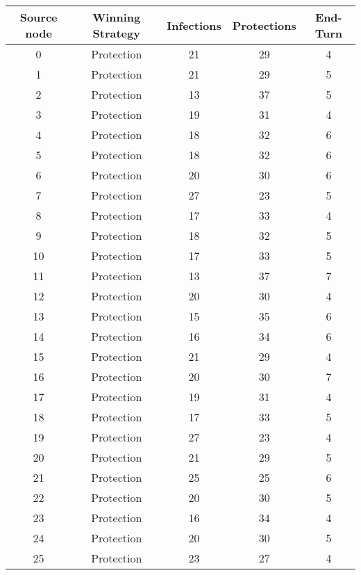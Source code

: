 \documentclass[results.tex]{subfiles}
\begin{document}
\begin{center}
  \begin{tabular}{| c || c | c | c | c |}
    \hline
    {\bfseries Source node} & {\bfseries Winning Strategy} & {\bfseries Infections} & {\bfseries Protections} & {\bfseries End-Turn} \\  %
    \hline\hline
    0 & Protection & 21 & 29 & 4 \\ 
    \hline
    1 & Protection & 21 & 29 & 5 \\ 
    \hline
    2 & Protection & 13 & 37 & 5 \\ 
    \hline
    3 & Protection & 19 & 31 & 4 \\ 
    \hline
    4 & Protection & 18 & 32 & 6 \\ 
    \hline
    5 & Protection & 18 & 32 & 6 \\ 
    \hline
    6 & Protection & 20 & 30 & 6 \\ 
    \hline
    7 & Protection & 27 & 23 & 5 \\ 
    \hline
    8 & Protection & 17 & 33 & 4 \\ 
    \hline
    9 & Protection & 18 & 32 & 5 \\ 
    \hline
    10 & Protection & 17 & 33 & 5 \\ 
    \hline
    11 & Protection & 13 & 37 & 7 \\ 
    \hline
    12 & Protection & 20 & 30 & 4 \\ 
    \hline
    13 & Protection & 15 & 35 & 6 \\ 
    \hline
    14 & Protection & 16 & 34 & 6 \\ 
    \hline
    15 & Protection & 21 & 29 & 4 \\ 
    \hline
    16 & Protection & 20 & 30 & 7 \\ 
    \hline
    17 & Protection & 19 & 31 & 4 \\ 
    \hline
    18 & Protection & 17 & 33 & 5 \\ 
    \hline
    19 & Protection & 27 & 23 & 4 \\ 
    \hline
    20 & Protection & 21 & 29 & 5 \\ 
    \hline
    21 & Protection & 25 & 25 & 6 \\ 
    \hline
    22 & Protection & 20 & 30 & 5 \\ 
    \hline
    23 & Protection & 16 & 34 & 4 \\ 
    \hline
    24 & Protection & 20 & 30 & 5 \\ 
    \hline
    25 & Protection & 23 & 27 & 4 \\ 

\end{tabular}
\end{center}
\end{document}
